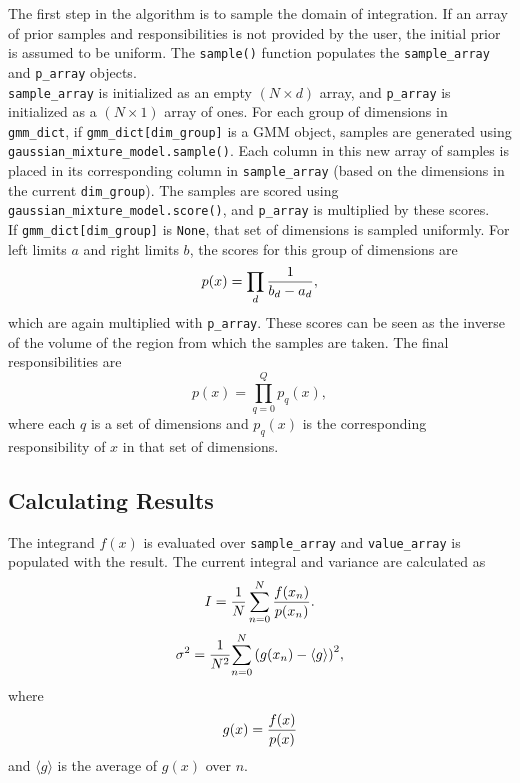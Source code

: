 \documentclass{article}
\begin{document}
The first step in the algorithm is to sample the domain of integration.
If an array of prior samples and responsibilities is not provided by the user,
the initial prior is assumed to be uniform. The \texttt{sample()} function
populates the \texttt{sample\_array} and \texttt{p\_array} objects. \\

\texttt{sample\_array} is initialized as an empty $(N \times d)$ array, and
\texttt{p\_array} is initialized as a $(N \times 1)$ array of ones. For each
group of dimensions in \texttt{gmm\_dict}, if \texttt{gmm\_dict[dim\_group]} is
a GMM object, samples are generated using \texttt{gaussian\_mixture\_model.sample()}.
Each column in this new array of samples is placed in its corresponding column in
\texttt{sample\_array} (based on the dimensions in the current \texttt{dim\_group}).
The samples are scored using \texttt{gaussian\_mixture\_model.score()}, and
\texttt{p\_array} is multiplied by these scores. \\

If \texttt{gmm\_dict[dim\_group]} is \texttt{None}, that set of dimensions is
sampled uniformly. For left limits $a$ and right limits $b$, the scores for this
group of dimensions are
\begin{equation}
    p(x) = \prod_{d} {1 \over {b_d - a_d}},
\end{equation}
which are again multiplied with \texttt{p\_array}. These scores can be seen as
the inverse of the volume of the region from which the samples are taken. The
final responsibilities are
\begin{equation}
    p(x) = \prod_{q=0}^{Q} p_q(x),
\end{equation}
where each $q$ is a set of dimensions and $p_q(x)$ is the corresponding
responsibility of $x$ in that set of dimensions.

\subsection{Calculating Results}

The integrand $f(x)$ is evaluated over \texttt{sample\_array} and \texttt{value\_array}
is populated with the result. The current integral and variance are calculated
as
\begin{equation}
    I = {{1 \over N} \sum_{n=0}^{N} {f(x_n) \over {p(x_n)}}}.
\end{equation}
\begin{equation}
    \sigma^2 = {1 \over N^2}{\sum\limits_{n=0}^{N} {(g(x_n) - \langle g \rangle)}^2},
\end{equation}
where
\begin{equation}
    g(x) = {f(x) \over {p(x)}}
\end{equation}
and $\langle g \rangle$ is the average of $g(x)$ over $n$. \\
\end{document}
